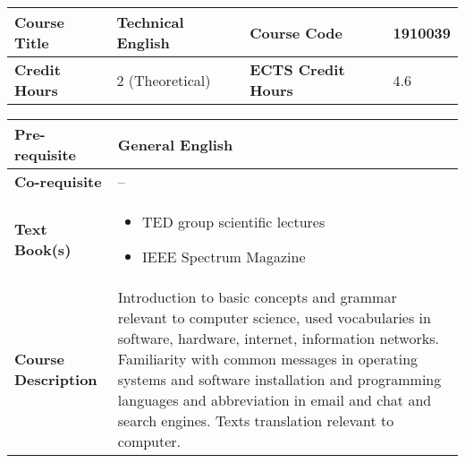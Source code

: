 \documentclass[12pt]{article}
\begin{document}
\bigskip
\bigskip


\begin{minipage}{\textwidth}
\begin{tabularx}{\textwidth}{|l|X|l|X|}
\hline
\textbf{Course Title}       &   Technical English & \textbf{Course Code}       &  1910039 \\ \hline
\textbf{Credit Hours}       &   2 (Theoretical) & \textbf{ECTS Credit Hours}       &  4.6 \\ \hline
\end{tabularx}

\begin{tabularx}{\textwidth}{|l|X|}
\hline
\textbf{Pre-requisite}      &  General English \\ \hline
\textbf{Co-requisite}       &  -- \\ \hline
\textbf{Text Book(s)}      & \begin{minipage}{.70\textwidth}
					\begin{itemize} \itemsep-0.4em
						\vspace{3mm}
						\item TED group scientific lectures
						\item IEEE Spectrum Magazine
						\vspace{3mm}
					\end{itemize}
				\end{minipage}  \\ \hline
\textbf{Course Description} & \begin{minipage}{.70\textwidth}
					\vspace{3mm}
										
					Introduction to basic concepts and grammar relevant to computer science, used vocabularies in
					software, hardware, internet, information networks.
					Familiarity with common messages in operating systems and software installation and programming
					languages and abbreviation in email and chat and search engines.
					Texts translation relevant to computer.
					\vspace{3mm}
					\end{minipage} \\ \hline
\end{tabularx}
\end{minipage}


\bigskip
\bigskip
\end{document}
